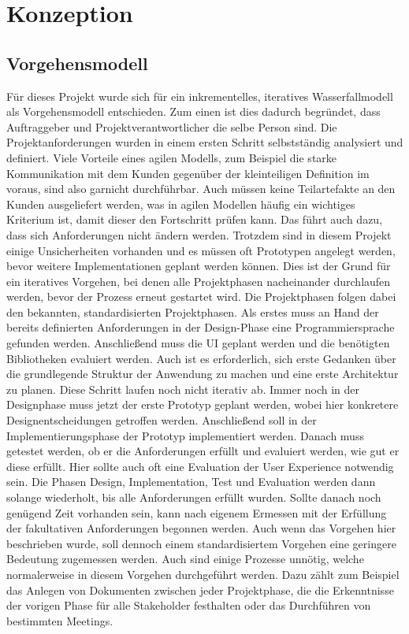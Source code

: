 \chapter{Konzeption}

\section{Vorgehensmodell}
Für dieses Projekt wurde sich für ein inkrementelles, iteratives Wasserfallmodell als Vorgehensmodell entschieden. Zum einen ist dies dadurch begründet, dass Auftraggeber und Projektverantwortlicher die selbe Person sind. Die Projektanforderungen wurden in einem ersten Schritt selbstständig analysiert und definiert. Viele Vorteile eines agilen Modells, zum Beispiel die starke Kommunikation mit dem Kunden gegenüber der kleinteiligen Definition im voraus, sind also garnicht durchführbar. Auch müssen keine Teilartefakte an den Kunden ausgeliefert werden, was in agilen Modellen häufig ein wichtiges Kriterium ist, damit dieser den Fortschritt prüfen kann. Das führt auch dazu, dass sich Anforderungen nicht ändern werden. Trotzdem sind in diesem Projekt einige Unsicherheiten vorhanden und es müssen oft Prototypen angelegt werden, bevor weitere Implementationen geplant werden können. Dies ist der Grund für ein iteratives Vorgehen, bei denen alle Projektphasen nacheinander durchlaufen werden, bevor der Prozess erneut gestartet wird. Die Projektphasen folgen dabei den bekannten, standardisierten Projektphasen.   Als erstes muss an Hand der bereits definierten Anforderungen in der Design-Phase eine Programmiersprache gefunden werden. Anschließend muss die UI geplant werden und die benötigten Bibliotheken evaluiert werden. Auch ist es erforderlich, sich erste Gedanken über die grundlegende Struktur der Anwendung zu machen und eine erste Architektur zu planen. Diese Schritt laufen noch nicht iterativ ab. Immer noch in der Designphase muss jetzt der erste Prototyp geplant werden, wobei hier konkretere Designentscheidungen getroffen werden. Anschließend soll in der Implementierungsphase der Prototyp implementiert werden. Danach muss getestet werden, ob er die Anforderungen erfüllt und evaluiert werden, wie gut er diese erfüllt. Hier sollte auch oft eine Evaluation der User Experience notwendig sein. Die Phasen Design, Implementation, Test und Evaluation werden dann solange wiederholt, bis alle Anforderungen erfüllt wurden. Sollte danach noch genügend Zeit vorhanden sein, kann nach eigenem Ermessen mit der Erfüllung der fakultativen Anforderungen begonnen werden. Auch wenn das Vorgehen hier beschrieben wurde, soll dennoch einem standardisiertem Vorgehen eine geringere Bedeutung zugemessen werden. Auch sind einige Prozesse unnötig, welche normalerweise in diesem Vorgehen durchgeführt werden. Dazu zählt zum Beispiel das Anlegen von Dokumenten zwischen jeder Projektphase, die die Erkenntnisse der vorigen Phase für alle Stakeholder festhalten oder das Durchführen von bestimmten Meetings.

